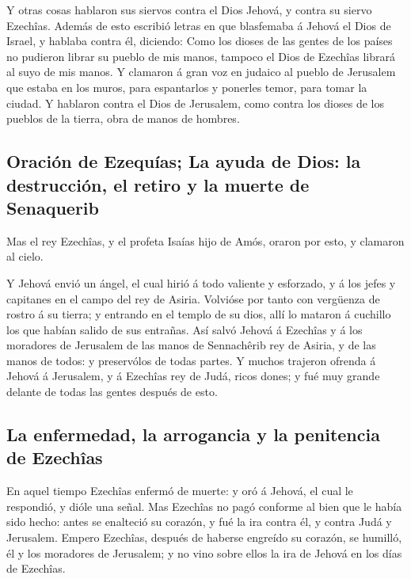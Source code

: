  Y otras cosas hablaron sus siervos contra el Dios Jehová,
y contra su siervo Ezechîas.  Además de esto escribió
letras en que blasfemaba á Jehová el Dios de Israel, y hablaba contra
él, diciendo: Como los dioses de las gentes de los países no pudieron
librar su pueblo de mis manos, tampoco el Dios de Ezechîas librará al
suyo de mis manos.  Y clamaron á gran voz en judaico al
pueblo de Jerusalem que estaba en los muros, para espantarlos y ponerles
temor, para tomar la ciudad.  Y hablaron contra el Dios de
Jerusalem, como contra los dioses de los pueblos de la tierra, obra de
manos de hombres.

\hypertarget{oraciuxf3n-de-ezequuxedas-la-ayuda-de-dios-la-destrucciuxf3n-el-retiro-y-la-muerte-de-senaquerib}{%
\subsection{Oración de Ezequías; La ayuda de Dios: la destrucción, el
retiro y la muerte de
Senaquerib}\label{oraciuxf3n-de-ezequuxedas-la-ayuda-de-dios-la-destrucciuxf3n-el-retiro-y-la-muerte-de-senaquerib}}

 Mas el rey Ezechîas, y el profeta Isaías hijo de Amós,
oraron por esto, y clamaron al cielo.

 Y Jehová envió un ángel, el cual hirió á todo valiente y
esforzado, y á los jefes y capitanes en el campo del rey de Asiria.
Volvióse por tanto con vergüenza de rostro á su tierra; y entrando en el
templo de su dios, allí lo mataron á cuchillo los que habían salido de
sus entrañas.  Así salvó Jehová á Ezechîas y á los
moradores de Jerusalem de las manos de Sennachêrib rey de Asiria, y de
las manos de todos: y preservólos de todas partes.  Y
muchos trajeron ofrenda á Jehová á Jerusalem, y á Ezechîas rey de Judá,
ricos dones; y fué muy grande delante de todas las gentes después de
esto.

\hypertarget{la-enfermedad-la-arrogancia-y-la-penitencia-de-ezechuxeeas}{%
\subsection{La enfermedad, la arrogancia y la penitencia de
Ezechîas}\label{la-enfermedad-la-arrogancia-y-la-penitencia-de-ezechuxeeas}}

 En aquel tiempo Ezechîas enfermó de muerte: y oró á
Jehová, el cual le respondió, y dióle una señal.  Mas
Ezechîas no pagó conforme al bien que le había sido hecho: antes se
enalteció su corazón, y fué la ira contra él, y contra Judá y Jerusalem.
 Empero Ezechîas, después de haberse engreído su corazón,
se humilló, él y los moradores de Jerusalem; y no vino sobre ellos la
ira de Jehová en los días de Ezechîas.

